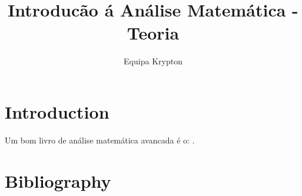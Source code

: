 \documentclass{article}
\title{Introducão á Análise Matemática - Teoria}
\author{Equipa Krypton}
\begin{document}
\maketitle

\section{Introduction}

Um bom livro de análise matemática avancada é o:  \cite{friedman1970foundations}.


\newpage
\section*{Bibliography}
\printbibliography
\end{document}
